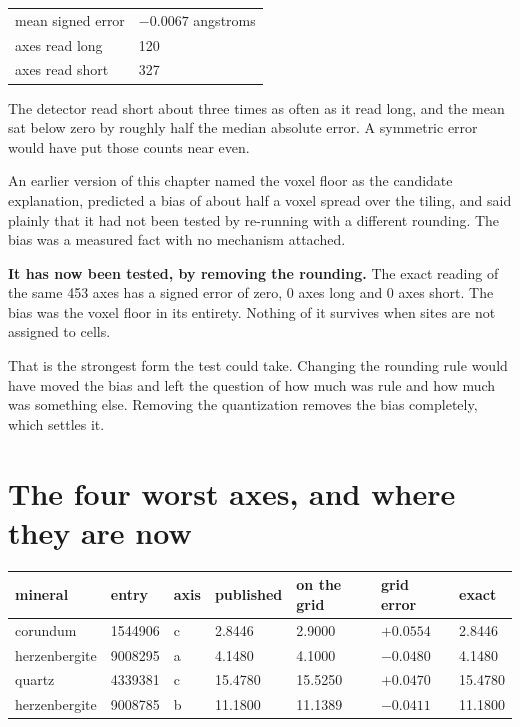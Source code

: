 \begin{longtable}{@{}p{}p{}@{}}
\toprule
\endhead
mean signed error & $-0.0067$ angstroms \\
axes read long & 120 \\
axes read short & 327 \\
\bottomrule
\end{longtable}

The detector read short about three times as often as it read long, and the mean sat below zero by roughly half the median absolute error. A symmetric error would have put those counts near even.

An earlier version of this chapter named the voxel floor as the candidate explanation, predicted a bias of about half a voxel spread over the tiling, and said plainly that it had not been tested by re-running with a different rounding. The bias was a measured fact with no mechanism attached.

\textbf{It has now been tested, by removing the rounding.} The exact reading of the same 453 axes has a signed error of zero, 0 axes long and 0 axes short. The bias was the voxel floor in its entirety. Nothing of it survives when sites are not assigned to cells.

That is the strongest form the test could take. Changing the rounding rule would have moved the bias and left the question of how much was rule and how much was something else. Removing the quantization removes the bias completely, which settles it.

\section{The four worst axes, and where they are now}

\begin{longtable}{@{}p{}p{}p{}p{}p{}p{}p{}@{}}
\toprule
mineral & entry & axis & published & on the grid & grid error & exact \\
\midrule
\endhead
corundum & 1544906 & c & 2.8446 & 2.9000 & $+0.0554$ & 2.8446 \\
herzenbergite & 9008295 & a & 4.1480 & 4.1000 & $-0.0480$ & 4.1480 \\
quartz & 4339381 & c & 15.4780 & 15.5250 & $+0.0470$ & 15.4780 \\
herzenbergite & 9008785 & b & 11.1800 & 11.1389 & $-0.0411$ & 11.1800 \\
\bottomrule
\end{longtable}

